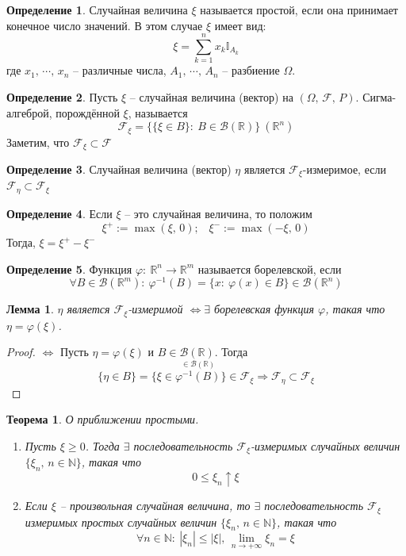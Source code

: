\documentclass[a4paper,12pt]{article}
\renewcommand{\phi}{\ensuremath{\varphi}}
\renewcommand{\leq}{\ensuremath{\leqslant}}
\renewcommand{\geq}{\ensuremath{\geqslant}}
\theoremstyle{plain}
\newtheorem{theorem}{Теорема}[section]
\newtheorem{lemma}{Лемма}[section]
\theoremstyle{definition}
\newtheorem{definition}{Определение}[section]
\theoremstyle{remark}
\begin{document}
\begin{definition}
	Случайная величина $\xi$ называется простой, если она принимает конечное число значений. В этом случае $\xi$ имеет вид:
	\[\xi = \sum_{k = 1}^n x_k \mathbb{I}_{A_k}\]
	где $x_1,\,\cdots,\,x_n$ -- различные числа, $A_1,\,\cdots,\,A_n$ -- разбиение $\Omega$.
\end{definition}

\begin{definition}
	Пусть $\xi$ -- случайная величина (вектор) на $(\Omega,\, \mathcal{F},\,P)$. Сигма-алгеброй, порождённой $\xi$, называется
	\[\mathcal{F}_\xi = \{\{\xi \in B\} :\: B \in \mathcal{B}(\mathbb{R})\} \: (\mathbb{R}^n)\]
	Заметим, что $\mathcal{F}_\xi \subset \mathcal{F}$
\end{definition}

\begin{definition}
	Случайная величина (вектор) $\eta$ является $\mathcal{F}_\xi$-измеримое, если $\mathcal{F}_\eta \subset \mathcal{F}_\xi$
\end{definition}

\begin{definition}
	Если $\xi$ -- это случайная величина, то положим
	\[\xi^+ := \max(\xi,\, 0);\;\;\; \xi^- := \max(-\xi,\, 0)\]
	Тогда, $\xi = \xi^+ - \xi^-$
\end{definition}

\begin{definition}
	Функция $\phi:\: \mathbb{R}^n \to \mathbb{R}^m$ называется борелевской, если
	\[\forall B \in \mathcal{B}(\mathbb{R}^m) :\: \phi^{-1}(B) = \{x :\: \phi(x) \in B\} \in \mathcal{B}(\mathbb{R}^n)\]
\end{definition}

\begin{lemma} \label{BOREL_MEASURE}
	$\eta$ является $\mathcal{F}_\xi$-измеримой $\Leftrightarrow \exists$ борелевская функция $\phi$, такая что $\eta = \phi(\xi)$.
\end{lemma}

\begin{proof}
	$\Leftrightarrow$ Пусть $\eta = \phi(\xi)$ и $B \in \mathcal{B}(\mathbb{R})$. Тогда
	\[\{\eta \in B\} = \{\xi \in \stackrel{\in \mathcal{B}(\mathbb{R})}{\phi^{-1}(B)}\} \in \mathcal{F}_\xi \Rightarrow \mathcal{F}_\eta \subset \mathcal{F}_\xi\]
\end{proof}

\begin{theorem}
	О приближении простыми.

	\begin{enumerate}
		\item Пусть $\xi \geq 0$. Тогда $\exists$ последовательность $\mathcal{F}_\xi$-измеримых случайных величин $\{\xi_n,\, n \in \mathbb{N}\}$, такая что
		      \[0 \leq \xi_n \uparrow \xi\]
		\item Если $\xi$ -- произвольная случайная величина, то $\exists$ последовательность $\mathcal{F}_\xi$ измеримых простых случайных величин $\{\xi_n,\, n \in \mathbb{N}\}$, такая что
		      \[\forall n \in \mathbb{N}:\: |\xi_n| \leq |\xi|,\, \lim_{n \to +\infty}\xi_n = \xi\]
	\end{enumerate}
\end{theorem}
\end{document}
